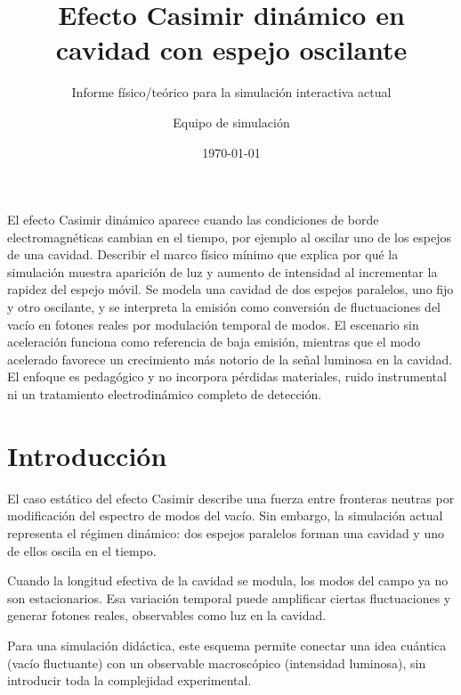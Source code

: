 \documentclass{aa}
\begin{document}
\title{Efecto Casimir dinámico en cavidad con espejo oscilante}

\subtitle{Informe físico/teórico para la simulación interactiva actual}

\author{Equipo de simulación}


\date{\today}

\abstract
{El efecto Casimir dinámico aparece cuando las condiciones de borde electromagnéticas cambian en el tiempo, por ejemplo al oscilar uno de los espejos de una cavidad.}
{Describir el marco físico mínimo que explica por qué la simulación muestra aparición de luz y aumento de intensidad al incrementar la rapidez del espejo móvil.}
{Se modela una cavidad de dos espejos paralelos, uno fijo y otro oscilante, y se interpreta la emisión como conversión de fluctuaciones del vacío en fotones reales por modulación temporal de modos.}
{El escenario sin aceleración funciona como referencia de baja emisión, mientras que el modo acelerado favorece un crecimiento más notorio de la señal luminosa en la cavidad.}
{El enfoque es pedagógico y no incorpora pérdidas materiales, ruido instrumental ni un tratamiento electrodinámico completo de detección.}


\maketitle

\section{Introducción}

El caso estático del efecto Casimir describe una fuerza entre fronteras neutras por modificación del espectro de modos del vacío. Sin embargo, la simulación actual representa el régimen dinámico: dos espejos paralelos forman una cavidad y uno de ellos oscila en el tiempo.

Cuando la longitud efectiva de la cavidad se modula, los modos del campo ya no son estacionarios. Esa variación temporal puede amplificar ciertas fluctuaciones y generar fotones reales, observables como luz en la cavidad.

Para una simulación didáctica, este esquema permite conectar una idea cuántica (vacío fluctuante) con un observable macroscópico (intensidad luminosa), sin introducir toda la complejidad experimental.
\end{document}

